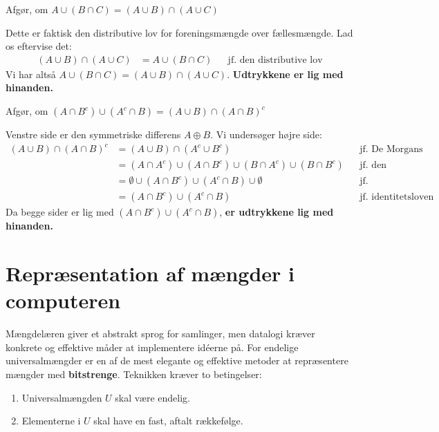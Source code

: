 \begin{example}{Afgør, om $A \cup (B \cap C) = (A \cup B) \cap (A \cup C)$}
\begin{solution}
Dette er faktisk den distributive lov for foreningsmængde over fællesmængde. Lad os eftervise det:
\begin{align*}
    (A \cup B) \cap (A \cup C) &= A \cup (B \cap C) && \text{jf. den distributive lov}
\end{align*}
Vi har altså $A \cup (B \cap C) = (A \cup B) \cap (A \cup C)$. \textbf{Udtrykkene er lig med hinanden.}
\end{solution}
\end{example}

\begin{example}{Afgør, om $(A \cap B^c) \cup (A^c \cap B) = (A \cup B) \cap (A \cap B)^c$}
\begin{solution}
Venstre side er den symmetriske differens $A \oplus B$. Vi undersøger højre side:
\begin{align*}
    (A \cup B) \cap (A \cap B)^c &= (A \cup B) \cap (A^c \cup B^c) && \text{jf. De Morgans lov} \\
    &= (A \cap A^c) \cup (A \cap B^c) \cup (B \cap A^c) \cup (B \cap B^c) && \text{jf. den distributive lov} \\
    &= \emptyset \cup (A \cap B^c) \cup (A^c \cap B) \cup \emptyset && \text{jf. komplementloven} \\
    &= (A \cap B^c) \cup (A^c \cap B) && \text{jf. identitetsloven}
\end{align*}
Da begge sider er lig med $(A \cap B^c) \cup (A^c \cap B)$, \textbf{er udtrykkene lig med hinanden.}
\end{solution}
\end{example}



\section{Repræsentation af mængder i computeren}
Mængdelæren giver et abstrakt sprog for samlinger, men datalogi kræver konkrete og effektive måder at implementere idéerne på. For endelige universalmængder er en af de mest elegante og effektive metoder at repræsentere mængder med \textbf{bitstrenge}. Teknikken kræver to betingelser:
\begin{enumerate}
    \item Universalmængden $U$ skal være endelig.
    \item Elementerne i $U$ skal have en fast, aftalt rækkefølge.
\end{enumerate}

